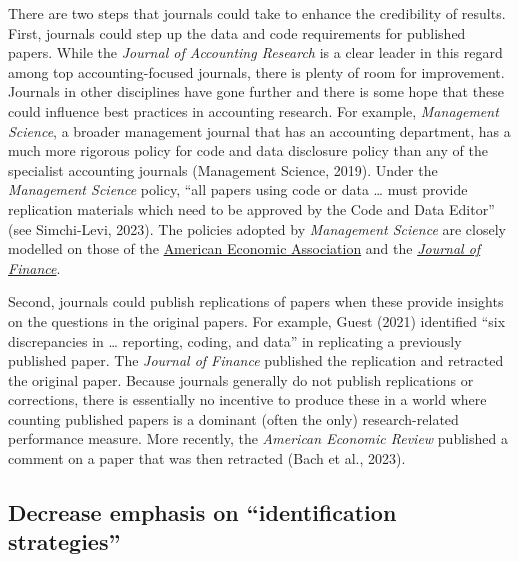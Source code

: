 \documentclass[
  letterpaper,
  DIV=11,
  numbers=noendperiod]{scrartcl}
\begin{document}
There are two steps that journals could take to enhance the credibility
of results. First, journals could step up the data and code requirements
for published papers. While the \emph{Journal of Accounting Research} is
a clear leader in this regard among top accounting-focused journals,
there is plenty of room for improvement. Journals in other disciplines
have gone further and there is some hope that these could influence best
practices in accounting research. For example, \emph{Management
Science}, a broader management journal that has an accounting
department, has a much more rigorous policy for code and data disclosure
policy than any of the specialist accounting journals (Management
Science, 2019). Under the \emph{Management Science} policy, ``all papers
using code or data \ldots{} must provide replication materials which
need to be approved by the Code and Data Editor'' (see Simchi-Levi,
2023). The policies adopted by \emph{Management Science} are closely
modelled on those of the
\href{https://www.aeaweb.org/journals/policies/data-availability-policy}{American
Economic Association} and the
\emph{\href{https://www.afajof.org/resource/resmgr/files/Submission_docs/CodePolicy.pdf}{Journal
of Finance}}.

Second, journals could publish replications of papers when these provide
insights on the questions in the original papers. For example, Guest
(2021) identified ``six discrepancies in \ldots{} reporting, coding, and
data'' in replicating a previously published paper. The \emph{Journal of
Finance} published the replication and retracted the original paper.
Because journals generally do not publish replications or corrections,
there is essentially no incentive to produce these in a world where
counting published papers is a dominant (often the only)
research-related performance measure. More recently, the \emph{American
Economic Review} published a comment on a paper that was then retracted
(Bach et al., 2023).

\hypertarget{decrease-emphasis-on-identification-strategies}{%
\subsection{Decrease emphasis on ``identification
strategies''}\label{decrease-emphasis-on-identification-strategies}}
\end{document}
